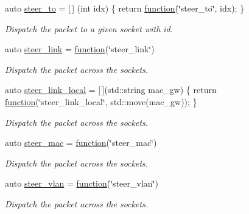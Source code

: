 \begin{DoxyCompactItemize}
auto \hyperlink{namespacepfq_1_1lang_1_1anonymous__namespace_02default_8hpp_03_a4980fea0af16a26df90f252b5ae21113}{steer\+\_\+to} = \mbox{[}$\,$\mbox{]} (int idx) \{ return \hyperlink{namespacepfq_1_1lang_a1a4638059d700ae08d0ca63886ff2bb3}{function}(\char`\"{}steer\+\_\+to\char`\"{}, idx); \}
\begin{DoxyCompactList}\small\item\em Dispatch the packet to a given socket with id. \end{DoxyCompactList}\item 
auto \hyperlink{namespacepfq_1_1lang_1_1anonymous__namespace_02default_8hpp_03_ac1f3f9a2caf886a1441e62860a4ca058}{steer\+\_\+link} = \hyperlink{namespacepfq_1_1lang_a1a4638059d700ae08d0ca63886ff2bb3}{function}(\char`\"{}steer\+\_\+link\char`\"{})
\begin{DoxyCompactList}\small\item\em Dispatch the packet across the sockets. \end{DoxyCompactList}\item 
auto \hyperlink{namespacepfq_1_1lang_1_1anonymous__namespace_02default_8hpp_03_a6bcbd11933d00917b62ef72890a98c3c}{steer\+\_\+link\+\_\+local} = \mbox{[}$\,$\mbox{]}(std\+::string mac\+\_\+gw) \{ return \hyperlink{namespacepfq_1_1lang_a1a4638059d700ae08d0ca63886ff2bb3}{function}(\char`\"{}steer\+\_\+link\+\_\+local\char`\"{}, std\+::move(mac\+\_\+gw)); \}
\begin{DoxyCompactList}\small\item\em Dispatch the packet across the sockets. \end{DoxyCompactList}\item 
auto \hyperlink{namespacepfq_1_1lang_1_1anonymous__namespace_02default_8hpp_03_ad51e91e3b485c729ac1ba39a46e337a0}{steer\+\_\+mac} = \hyperlink{namespacepfq_1_1lang_a1a4638059d700ae08d0ca63886ff2bb3}{function}(\char`\"{}steer\+\_\+mac\char`\"{})
\begin{DoxyCompactList}\small\item\em Dispatch the packet across the sockets. \end{DoxyCompactList}\item 
auto \hyperlink{namespacepfq_1_1lang_1_1anonymous__namespace_02default_8hpp_03_a2c6a8ad5a3ae8b60a6a3d18a510f22ac}{steer\+\_\+vlan} = \hyperlink{namespacepfq_1_1lang_a1a4638059d700ae08d0ca63886ff2bb3}{function}(\char`\"{}steer\+\_\+vlan\char`\"{})
\begin{DoxyCompactList}\small\item\em Dispatch the packet across the sockets. \end{DoxyCompactList}\item 

\end{DoxyCompactItemize}
